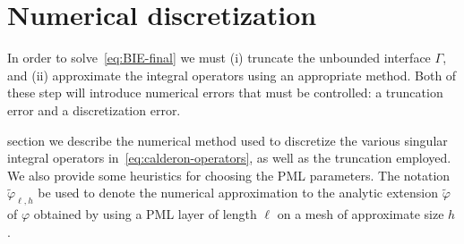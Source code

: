 \documentclass[11pt]{article}
\newcommand{\tvarphi}{\tilde \varphi}
\begin{document}
\section{Numerical discretization}

In order to solve~\cref{eq:BIE-final} we must (i) truncate the unbounded
interface $\Gamma$, and (ii) approximate the integral operators using an
appropriate method. Both of these step will introduce numerical errors that must
be controlled: a truncation error and a discretization error.

section we describe the numerical method used to discretize the various singular
integral operators in~\cref{eq:calderon-operators}, as well as the truncation
employed. We also provide some heuristics for choosing the PML parameters. The
notation $\tvarphi_{\ell,h}$ be used to denote the numerical approximation to
the analytic extension $\tvarphi$ of $\varphi$ obtained by using a PML layer of
length $\ell$ on a mesh of approximate size $h$. 
\end{document}
